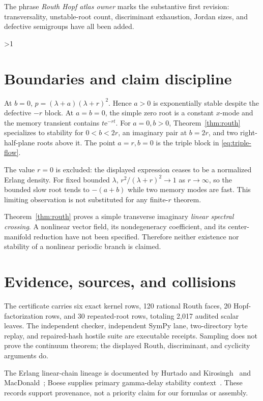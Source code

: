 \documentclass[9pt]{extarticle}
\providecommand{\CRevisionRound}{2}
\newcommand{\ee}{\mathrm e}
\begin{document}
The phrase \emph{Routh Hopf atlas owner} marks the substantive first
revision: transversality, unstable-root count, discriminant exhaustion,
Jordan sizes, and defective semigroups have all been added.
\fi

\ifnum\CRevisionRound>1
\section{Boundaries and claim discipline}
At $b=0$, $p=(\lambda+a)(\lambda+r)^2$.  Hence $a>0$ is exponentially
stable despite the defective $-r$ block.  At $a=b=0$, the simple zero root
is a constant $x$-mode and the memory transient contains $t\ee^{-rt}$.
For $a=0,b>0$, Theorem~\ref{thm:routh} specializes to stability for
$0<b<2r$, an imaginary pair at $b=2r$, and two right-half-plane roots
above it.  The point $a=r,b=0$ is the triple block in
\eqref{eq:triple-flow}.

The value $r=0$ is excluded: the displayed expression ceases to be a
normalized Erlang density.  For fixed bounded $\lambda$,
$r^2/(\lambda+r)^2\to1$ as $r\to\infty$, so the bounded slow root tends
to $-(a+b)$ while two memory modes are fast.  This limiting observation is
not substituted for any finite-$r$ theorem.

Theorem~\ref{thm:routh} proves a simple transverse imaginary
\emph{linear spectral crossing}.  A nonlinear vector field, its
nondegeneracy coefficient, and its center-manifold reduction have not been
specified.  Therefore neither existence nor stability of a nonlinear
periodic branch is claimed.

\section{Evidence, sources, and collisions}
The certificate carries six exact kernel rows, 120 rational Routh faces,
20 Hopf-factorization rows, and 30 repeated-root rows, totaling 2,017
audited scalar leaves.  The independent checker, independent SymPy lane,
two-directory byte replay, and repaired-hash hostile suite are executable
receipts.  Sampling does not prove the continuum theorem; the displayed
Routh, discriminant, and cyclicity arguments do.

The Erlang linear-chain lineage is documented by Hurtado and
Kirosingh~\cite{Hurtado2019} and MacDonald~\cite{MacDonald1978};
Boese supplies primary gamma-delay stability context~\cite{Boese1989}.
These records support provenance, not a priority claim for our formulas or
assembly.
\end{document}
